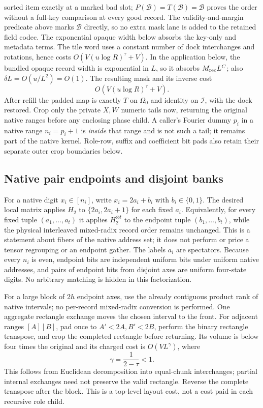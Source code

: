 sorted item exactly at a marked bad slot;
$P(\mathcal B)=T(\mathcal B)=\mathcal B$ proves the
order without a full-key comparison at every good record. The
validity-and-margin predicate above marks $\mathcal B$ directly, so no extra mask lane is added
to the retained field codec. The exponential opaque width
below absorbs the key-only and metadata terms. The tile word uses
a constant number of dock interchanges and rotations, hence costs
$O(V(u\log R)^\tau+V)$.  In the application below, the bundled opaque
record width is exponential in $L$, so it absorbs $M_{\rm rec}L^C$; also
$\delta L=O(u/L^2)=O(1)$.  The resulting mask and its inverse cost
\[
                       O(V(u\log R)^\tau+V).
\]
After refill the padded map is exactly $T$ on $\Omega_0$ and identity
on $\mathcal I$, with the dock restored. Crop only the private $X,W$
numeric tails now, returning the original native ranges before any
enclosing phase child. A caller's Fourier dummy $p_i$ in a native
range $n_i=p_i+1$ is \emph{inside} that range and is not such a tail;
it remains part of the native kernel. Role-row, suffix and coefficient
bit pads also retain their separate outer crop boundaries below.

\subsection{Native pair endpoints and disjoint banks}

For a native digit $x_i\in[n_i]$, write $x_i=2a_i+b_i$ with
$b_i\in\{0,1\}$.  The desired local matrix applies $H_2$ to
$\{2a_i,2a_i+1\}$ for each fixed $a_i$.  Equivalently, for every fixed
tuple $(a_1,\ldots,a_t)$ it applies $H_2^{\otimes t}$ to the endpoint
tuple $(b_1,\ldots,b_t)$, while the physical interleaved mixed-radix
record order remains unchanged.  This is a statement about fibers of the
native address set; it does not perform or price a tensor regrouping or an
endpoint gather.  The labels $a_i$ are spectators.  Because every $n_i$
is even, endpoint bits are independent uniform bits under uniform native
addresses, and pairs of endpoint bits from disjoint axes are uniform
four-state digits.  No arbitrary matching is hidden in this factorization.

For a large block of $2h$ endpoint axes, use the already contiguous
product rank of native intervals; no per-record mixed-radix conversion is
performed.  One aggregate rectangle exchange moves the chosen interval
to the front.  For adjacent ranges $[A][B]$, pad once to
$A'<2A,B'<2B$, perform the binary rectangle transpose, and crop the
completed rectangle before returning.  Its volume is below four times
the original and its charged cost is $O(VL^\gamma)$, where
\[
                  \gamma=\frac1{2-\tau}<1.
\]
This follows from Euclidean decomposition into equal-chunk interchanges;
partial internal exchanges need not preserve the valid rectangle.  Reverse
the complete transpose after the block.  This is a top-level layout cost,
not a cost paid in each recursive role child.

